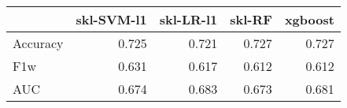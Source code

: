 \begin{tabular}{lrrrr}
\toprule
{} &  skl-SVM-l1 &  skl-LR-l1 &  skl-RF &  xgboost \\
\midrule
Accuracy &       0.725 &      0.721 &   0.727 &    0.727 \\
F1w      &       0.631 &      0.617 &   0.612 &    0.612 \\
AUC      &       0.674 &      0.683 &   0.673 &    0.681 \\
\bottomrule
\end{tabular}
